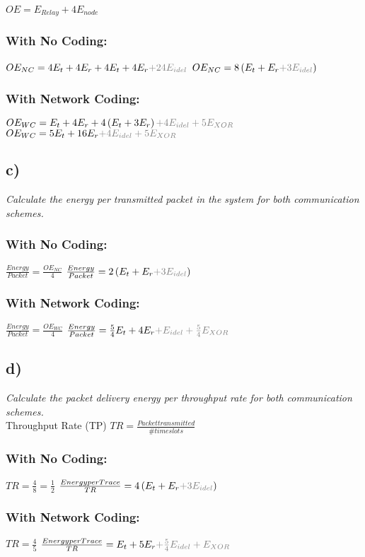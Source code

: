 $OE = E_{Relay}+4E_{node}$
\subsubsection{With No Coding:}
$OE_{NC} = 4E_t+4E_r+4E_t+4E_r\textcolor{gray}{+24E_{idel}}$
$OE_{NC} = 8\left(E_t+E_r\textcolor{gray}{+3E_{idel}}\right)$
\subsubsection{With Network Coding:}
$OE_{WC} = E_t+4E_r+4\left(E_t+3E_r\right)\textcolor{gray}{+4E_{idel}+5E_{XOR}}$
$OE_{WC} = 5E_t+16E_r\textcolor{gray}{+4E_{idel}+5E_{XOR}}$

\FloatBarrier
\subsection{c)} 
\textit{Calculate the energy per transmitted packet in the system for both communication schemes.}

\subsubsection{With No Coding:}
$\frac{Energy}{Packet}=\frac{OE_{NC}}{4}$
$\frac{Energy}{Packet}=2\left(E_t+E_r\textcolor{gray}{+3E_{idel}}\right)$
\subsubsection{With Network Coding:}
$\frac{Energy}{Packet}=\frac{OE_{WC}}{4}$
$\frac{Energy}{Packet}=\frac{5}{4}E_t+4E_r\textcolor{gray}{+E_{idel}+\frac{5}{4}E_{XOR}}$

\FloatBarrier
\subsection{d)} 
\textit{Calculate the packet delivery energy per throughput rate for both communication schemes.}\\

Throughput Rate (TP) $TR=\frac{Packet transmitted}{\# time slots}$
\subsubsection{With No Coding:}
$TR=\frac{4}{8}=\frac{1}{2}$
$\frac{Energy per Trace}{TR}=4\left(E_t+E_r\textcolor{gray}{+3E_{idel}}\right)$
\subsubsection{With Network Coding:}
$TR=\frac{4}{5}$
$\frac{Energy per Trace}{TR}=E_t+5E_r\textcolor{gray}{+\frac{5}{4}E_{idel}+E_{XOR}}$

